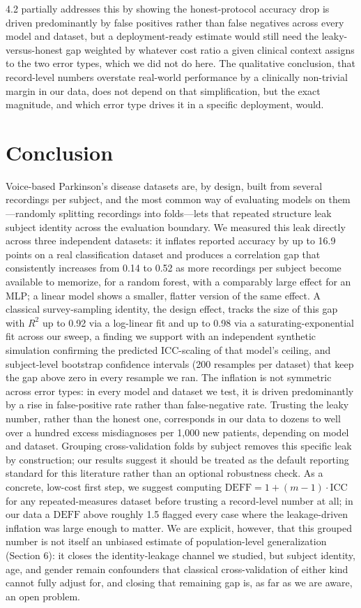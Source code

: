 \documentclass[11pt]{article}
\begin{document}
4.2 partially addresses this by showing the honest-protocol accuracy drop is driven predominantly by false positives rather than false negatives across every model and dataset, but a deployment-ready estimate would still need the leaky-versus-honest gap weighted by whatever cost ratio a given clinical context assigns to the two error types, which we did not do here. The qualitative conclusion, that record-level numbers overstate real-world performance by a clinically non-trivial margin in our data, does not depend on that simplification, but the exact magnitude, and which error type drives it in a specific deployment, would.

\section{Conclusion}
Voice-based Parkinson's disease datasets are, by design, built from several recordings per subject, and the most common way of evaluating models on them---randomly splitting recordings into folds---lets that repeated structure leak subject identity across the evaluation boundary. We measured this leak directly across three independent datasets: it inflates reported accuracy by up to 16.9 points on a real classification dataset and produces a correlation gap that consistently increases from 0.14 to 0.52 as more recordings per subject become available to memorize, for a random forest, with a comparably large effect for an MLP; a linear model shows a smaller, flatter version of the same effect. A classical survey-sampling identity, the design effect, tracks the size of this gap with $R^2$ up to 0.92 via a log-linear fit and up to 0.98 via a saturating-exponential fit across our sweep, a finding we support with an independent synthetic simulation confirming the predicted ICC-scaling of that model's ceiling, and subject-level bootstrap confidence intervals (200 resamples per dataset) that keep the gap above zero in every resample we ran. The inflation is not symmetric across error types: in every model and dataset we test, it is driven predominantly by a rise in false-positive rate rather than false-negative rate. Trusting the leaky number, rather than the honest one, corresponds in our data to dozens to well over a hundred excess misdiagnoses per 1,000 new patients, depending on model and dataset. Grouping cross-validation folds by subject removes this specific leak by construction; our results suggest it should be treated as the default reporting standard for this literature rather than an optional robustness check. As a concrete, low-cost first step, we suggest computing $\mathrm{DEFF}=1+(m-1)\cdot\mathrm{ICC}$ for any repeated-measures dataset before trusting a record-level number at all; in our data a $\mathrm{DEFF}$ above roughly 1.5 flagged every case where the leakage-driven inflation was large enough to matter. We are explicit, however, that this grouped number is not itself an unbiased estimate of population-level generalization (Section 6): it closes the identity-leakage channel we studied, but subject identity, age, and gender remain confounders that classical cross-validation of either kind cannot fully adjust for, and closing that remaining gap is, as far as we are aware, an open problem.
\end{document}

